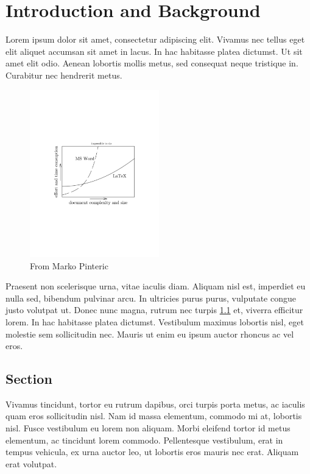 \chapter{Introduction and Background}
\label{intro}
Lorem ipsum dolor sit amet, consectetur adipiscing elit. Vivamus nec tellus eget elit aliquet accumsan sit amet in lacus. In hac habitasse platea dictumst. Ut sit amet elit odio. Aenean lobortis mollis metus, sed consequat neque tristique in. Curabitur nec hendrerit metus. 

\begin{figure}[b!]
\centering
  \includegraphics[width=0.5\textwidth]{Figures/Latex.pdf}
  \caption{From Marko Pinteric}
  \label{fig:Latex}
\end{figure}

Praesent non scelerisque urna, vitae iaculis diam. Aliquam nisl est, imperdiet eu nulla sed, bibendum pulvinar arcu. In ultricies purus purus, vulputate congue justo volutpat ut. Donec nunc magna, rutrum nec turpis \ref{fig:Latex} et, viverra efficitur lorem. In hac habitasse platea dictumst. Vestibulum maximus lobortis nisl, eget molestie sem sollicitudin nec. Mauris ut enim eu ipsum auctor rhoncus ac vel eros.

\section{Section}
Vivamus tincidunt, tortor eu rutrum dapibus, orci turpis porta metus, ac iaculis quam eros sollicitudin nisl. Nam id massa elementum, commodo mi at, lobortis nisl. Fusce vestibulum eu lorem non aliquam. Morbi eleifend tortor id metus elementum, ac tincidunt lorem commodo. Pellentesque vestibulum, erat in tempus vehicula, ex urna auctor leo, ut lobortis eros mauris nec erat. Aliquam erat volutpat.

